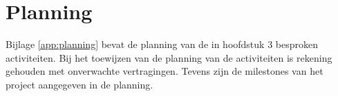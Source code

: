 \chapter{Planning}

Bijlage \ref{app:planning} bevat de planning van de in hoofdstuk 3 besproken
activiteiten. Bij het toewijzen van de planning van de activiteiten is rekening
gehouden met onverwachte vertragingen. Tevens zijn de milestones van het project
aangegeven in de planning.
